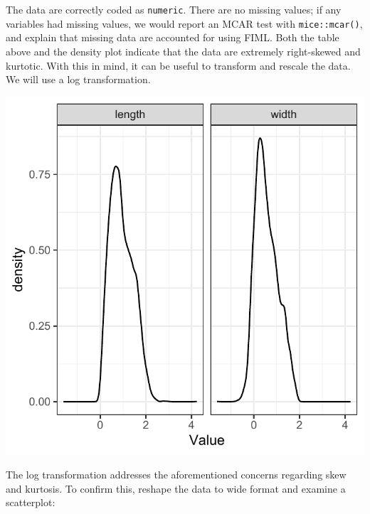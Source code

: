 \documentclass[
  man,floatsintext]{apa6}
\newenvironment{Shaded}{\begin{snugshade}}{\end{snugshade}}
\newcommand{\AttributeTok}[1]{\textcolor[rgb]{0.77,0.63,0.00}{#1}}
\newcommand{\FunctionTok}[1]{\textcolor[rgb]{0.00,0.00,0.00}{#1}}
\newcommand{\NormalTok}[1]{#1}
\newcommand{\OtherTok}[1]{\textcolor[rgb]{0.56,0.35,0.01}{#1}}
\newcommand{\SpecialCharTok}[1]{\textcolor[rgb]{0.00,0.00,0.00}{#1}}
\begin{document}
The data are correctly coded as \texttt{numeric}.
There are no missing values; if any variables had missing values, we would report an MCAR test with \texttt{mice::mcar()},
and explain that missing data are accounted for using FIML.
Both the table above and the density plot indicate that the data are extremely right-skewed and kurtotic.
With this in mind, it can be useful to transform and rescale the data.
We will use a log transformation.

\begin{Shaded}
\end{Shaded}

\includegraphics{appendices/plot_gmm_desc_log.pdf}

The log transformation addresses the aforementioned concerns regarding skew and kurtosis.
To confirm this, reshape the data to wide format
and examine a scatterplot:
\end{document}
